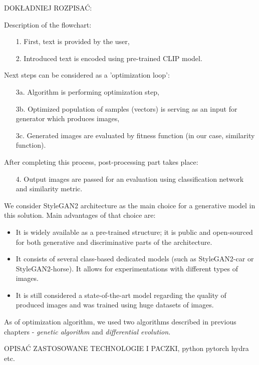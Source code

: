 \documentclass[12pt,a4paper,openany]{book}
\begin{document}
DOKŁADNIEJ ROZPISAĆ:

\noindent Description of the flowchart:
\begin{enumerate}
\item [1.] First, text is provided by the user,
\item [2.] Introduced text is encoded using pre-trained CLIP model.
\end{enumerate}
Next steps can be considered as a 'optimization loop':
\begin{enumerate}
\item [3a.] Algorithm is performing optimization step,
\item [3b.] Optimized population of samples (vectors)  is serving as an input for generator which produces images,
\item [3c.] Generated images are evaluated by fitness function (in our case, similarity function).
\end{enumerate}
After completing this process, post-processing part takes place:
\begin{enumerate}
\item [4.] Output images are passed for an evaluation using classification network and similarity metric.
\end{enumerate}

We consider StyleGAN2 architecture as the main choice for a generative model in this solution. Main advantages of that choice are:
\begin{itemize}
\item It is widely available as a pre-trained structure; it is public and open-sourced for both generative and discriminative parts of the architecture.
\item It consists of several class-based dedicated models (such as StyleGAN2-car or StyleGAN2-horse). It allows for experimentations with different types of images.
\item It is still considered a state-of-the-art model regarding the quality of produced images and was trained using huge datasets of images.
\end{itemize}

As of optimization algorithm, we used two algorithms described in previous chapters - \textit{genetic algorithm} and \textit{differential evolution}.



OPISAĆ ZASTOSOWANE TECHNOLOGIE I PACZKI, python pytorch hydra etc.
\end{document}
